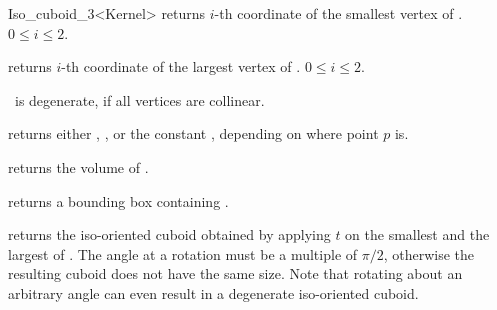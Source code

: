 \begin{ccRefClass} {Iso_cuboid_3<Kernel>}
         {returns $i$-th  coordinate of
          the smallest vertex of \ccVar. 
          \ccPrecond $0 \leq i \leq 2$.}

         {returns $i$-th  coordinate of
          the largest vertex of \ccVar. 
          \ccPrecond $0 \leq i \leq 2$.}

\ccPredicates

       {%
        \ccVar\ is degenerate, if all vertices
        are collinear.}

       {returns either ,
        , or the constant
        , 
        depending on where point $p$ is.}

       {}
\ccGlue
{}
       {}
\ccGlue
{}
       {}


       {returns the volume of \ccVar. }

       {returns a bounding box containing \ccVar. }

       {returns the iso-oriented cuboid obtained by applying $t$ on 
        the smallest and the largest of \ccVar.
        \ccPrecond The angle at a rotation must be a multiple of $\pi/2$,
        otherwise the resulting cuboid does not have the same size.
        Note that rotating about an arbitrary angle can even result in
        a degenerate iso-oriented cuboid.}


\ccSeeAlso
{} \\

\end{ccRefClass} 
